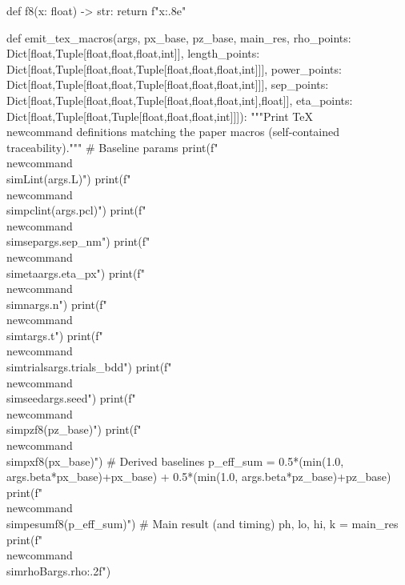 def f8(x: float) -> str:
    return f"{x:.8e}"

def emit_tex_macros(args,
                    px_base, pz_base,
                    main_res,
                    rho_points: Dict[float,Tuple[float,float,float,int]],
                    length_points: Dict[float,Tuple[float,float,Tuple[float,float,float,int]]],
                    power_points: Dict[float,Tuple[float,float,Tuple[float,float,float,int]]],
                    sep_points: Dict[float,Tuple[float,float,Tuple[float,float,float,int],float]],
                    eta_points: Dict[float,Tuple[float,Tuple[float,float,float,int]]]):
    """Print TeX \\newcommand definitions matching the paper macros (self-contained traceability)."""
    # Baseline params
    print(f"\\newcommand{{\\simL}}{{{int(args.L)}}}")
    print(f"\\newcommand{{\\simpcl}}{{{int(args.pcl)}}}")
    print(f"\\newcommand{{\\simsep}}{{{args.sep_nm}}}")
    print(f"\\newcommand{{\\simeta}}{{{args.eta_px}}}")
    print(f"\\newcommand{{\\simn}}{{{args.n}}}")
    print(f"\\newcommand{{\\simt}}{{{args.t}}}")
    print(f"\\newcommand{{\\simtrials}}{{{args.trials_bdd}}}")
    print(f"\\newcommand{{\\simseed}}{{{args.seed}}}")
    print(f"\\newcommand{{\\simpz}}{{{f8(pz_base)}}}")
    print(f"\\newcommand{{\\simpx}}{{{f8(px_base)}}}")
    # Derived baselines
    p_eff_sum = 0.5*(min(1.0, args.beta*px_base)+px_base) + 0.5*(min(1.0, args.beta*pz_base)+pz_base)
    print(f"\\newcommand{{\\simpesum}}{{{f8(p_eff_sum)}}}")
    # Main result (and timing)
    ph, lo, hi, k = main_res
    print(f"\\newcommand{{\\simrhoB}}{{{args.rho:.2f}}}")
